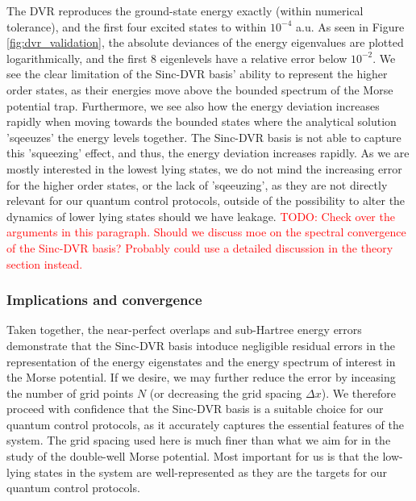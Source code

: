 \documentclass{subfiles}
\begin{document}
The DVR reproduces the ground-state energy exactly (within numerical tolerance), and the first four excited states to within $10^{-4}$ a.u. As seen in Figure \ref{fig:dvr_validation}, the absolute deviances of the energy eigenvalues are plotted logarithmically, and the first 8 eigenlevels have a relative error below $10^{-2}$. We see the clear limitation of the Sinc-DVR basis' ability to represent the higher order states, as their energies move above the bounded spectrum of the Morse potential trap. Furthermore, we see also how the energy deviation increases rapidly when moving towards the bounded states where the analytical solution 'sqeeuzes' the energy levels together. The Sinc-DVR basis is not able to capture this 'squeezing' effect, and thus, the energy deviation increases rapidly. 
As we are mostly interested in the lowest lying states, we do not mind the increasing error for the higher order states, or the lack of 'sqeeuzing', as they are not directly relevant for our quantum control protocols, outside of the possibility to alter the dynamics of lower lying states should we have leakage.  \textcolor{red}{TODO: Check over the arguments in this paragraph. Should we discuss moe on the spectral convergence of the Sinc-DVR basis? Probably could use a detailed discussion in the theory section instead.}
\subsubsection{Implications and convergence}
Taken together, the near-perfect overlaps and sub-Hartree energy errors demonstrate that the Sinc-DVR basis intoduce negligible residual errors in the representation of the energy eigenstates and the energy spectrum of interest in the Morse potential. If we desire, we may further reduce the error by inceasing the number of grid points $N$ (or decreasing the grid spacing $\Delta x$). We therefore proceed with confidence that the Sinc-DVR basis is a suitable choice for our quantum control protocols, as it accurately captures the essential features of the system. The grid spacing used here is much finer than what we aim for in the study of the double-well Morse potential. Most important for us is that the low-lying states in the system are well-represented as they are the targets for our quantum control protocols. 
\end{document}

